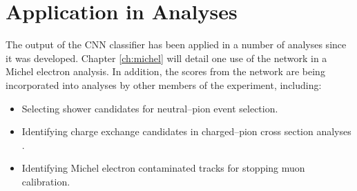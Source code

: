 \section{Application in \protodune{} Analyses} \label{cnn-appl}
The output of the CNN classifier has been applied in a number of \protodune{}
analyses since it was developed. Chapter \ref{ch:michel} will detail one use of
the network in a Michel electron analysis. In addition, the scores from the
network are being incorporated into analyses by other members of the 
\protodune{} experiment, including:
\begin{itemize}
	\item Selecting shower candidates for neutral--pion event selection\cite{pi_0}.
	\item Identifying charge exchange candidates in charged--pion cross section 
		analyses \cite{pion_exchange}.
	\item Identifying Michel electron contaminated tracks for stopping muon
		calibration\cite{fabio_muon}.
\end{itemize}
